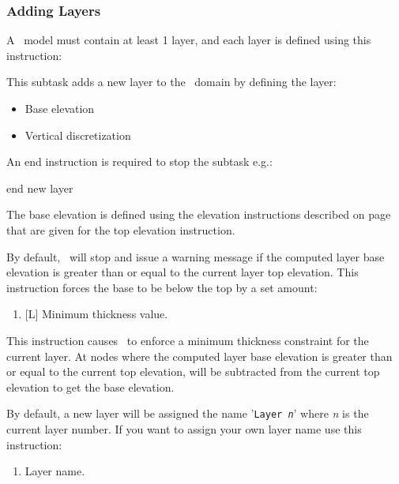 \subsubsection{Adding Layers} 
A \mfus\ model must contain at least 1 layer, and each layer is defined using this instruction:     {

    {This subtask adds a new layer to the \gwf\ domain by defining the layer:
     \begin{itemize}
       \item Base elevation
       \item Vertical discretization
     \end{itemize}

    An end instruction is required to stop the subtask e.g.:

    {\Large \sf end new layer}
    }

The base elevation is defined using the elevation instructions  described on page~\pageref{'Page:TopElev'} that are given for the \textsf{top elevation} instruction.

By default, \mut\ will stop and issue a warning message if the computed layer base elevation is greater than or equal to the current layer top elevation.  This instruction forces the base to be below the top by a set amount:

    {\squish
    \begin{enumerate}
    \item {}[L]  Minimum thickness value.
    \end{enumerate}
    This instruction causes \mut\ to enforce a minimum thickness constraint for the current layer. At nodes where the computed layer base elevation is greater than or equal to the current top elevation,  will
    be subtracted from the current top elevation to get the base elevation.
    }


By default, a new layer will be assigned the name '\texttt{Layer {\em n}}' where {\em n} is the current layer number.  If you want to assign your own layer name use this instruction:

    {
    \squish
    \begin{enumerate}
    \item {} Layer name.
    \end{enumerate}
    \squish
    }

 
}
